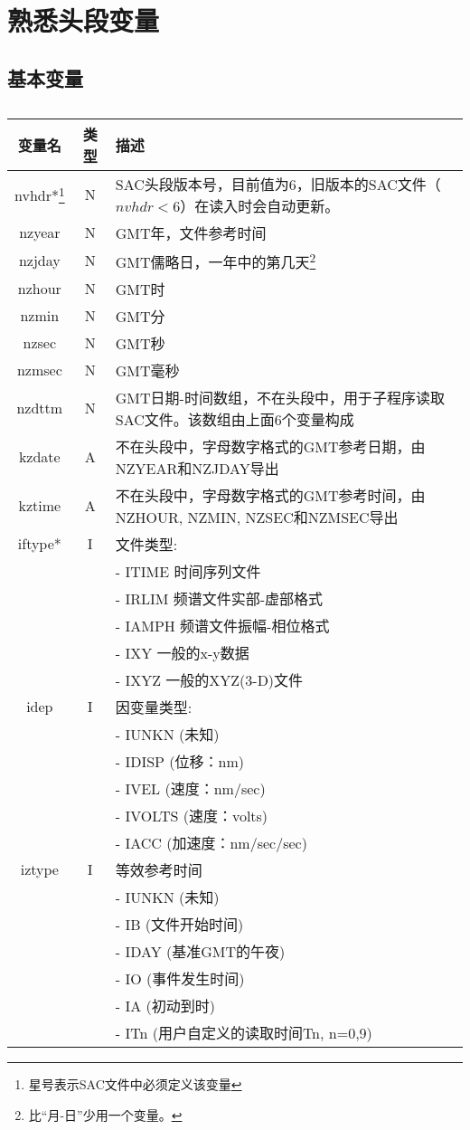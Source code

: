 \section{熟悉头段变量}

\subsection{基本变量}
\begin{table}[H]
\centering
\caption{}
\label{}
\begin{tabular}{ccl}
    \toprule
	变量名	&	类型	&	描述\\
	\midrule
    nvhdr*\footnote{星号表示SAC文件中必须定义该变量}	&	N		&	SAC头段版本号，目前值为6，旧版本的SAC文件（$nvhdr<6$）在读入时会自动更新。\\
	nzyear	&	N 		&	GMT年，文件参考时间	\\
    nzjday  &   N       &   GMT儒略日，一年中的第几天\footnote{比``月-日''少用一个变量。}    \\
    nzhour  &   N       &   GMT时   \\
    nzmin   &   N       &   GMT分   \\
    nzsec   &   N       &   GMT秒   \\
    nzmsec  &   N       &  GMT毫秒  \\
	nzdttm	&	N 		&	GMT日期-时间数组，不在头段中，用于子程序读取SAC文件。该数组由上面6个变量构成    \\
	kzdate	&	A		&	不在头段中，字母数字格式的GMT参考日期，由NZYEAR和NZJDAY导出\\
	kztime	&	A		&	不在头段中，字母数字格式的GMT参考时间，由NZHOUR, NZMIN, NZSEC和NZMSEC导出\\
	iftype*	&	I		&	文件类型:\\
						&& \quad- ITIME 时间序列文件	\\
						&& \quad- IRLIM 频谱文件实部-虚部格式 \\
 						&& \quad- IAMPH 频谱文件振幅-相位格式	\\
						&& \quad- IXY 一般的x-y数据 	\\
						&& \quad- IXYZ 一般的XYZ(3-D)文件\\	
	idep	&	I		&	因变量类型:\\
						&& \quad- IUNKN (未知)	\\
						&& \quad- IDISP (位移：nm)	\\
						&& \quad- IVEL (速度：nm/sec)	\\
						&& \quad- IVOLTS (速度：volts)	\\
						&& \quad- IACC (加速度：nm/sec/sec)	\\
	iztype	&	I 		&	等效参考时间	\\
						&& \quad- IUNKN (未知)	\\
						&& \quad- IB (文件开始时间)	\\
						&& \quad- IDAY (基准GMT的午夜)	\\
						&& \quad- IO (事件发生时间)	\\
						&& \quad- IA (初动到时)	\\
						&& \quad- ITn (用户自定义的读取时间Tn, n=0,9)	\\
    \bottomrule
\end{tabular}
\end{table}


